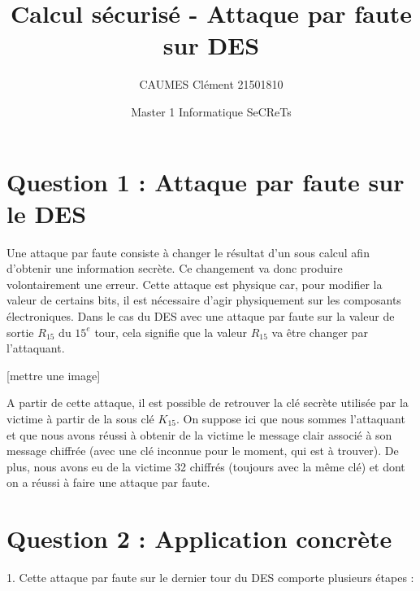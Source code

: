 \documentclass[11pt]{article}
\title{\huge{\textbf Calcul sécurisé - Attaque par faute sur DES}}
\author{CAUMES Clément 21501810}
\date{Master 1 Informatique SeCReTs}
\begin{document}
\maketitle
\vspace{20em}
\newpage

\tableofcontents
\newpage

\section{Question 1 : Attaque par faute sur le DES}

Une attaque par faute consiste à changer le résultat d'un sous calcul afin d'obtenir une information secrète. Ce changement va donc produire volontairement une erreur. Cette attaque est physique car, pour modifier la valeur de certains bits, il est nécessaire d'agir physiquement sur les composants électroniques. 
Dans le cas du DES avec une attaque par faute sur la valeur de sortie $R_{15}$ du $15^{e}$ tour, cela signifie que la valeur $R_{15}$ va être changer par l'attaquant. 

[mettre une image]

A partir de cette attaque, il est possible de retrouver la clé secrète utilisée par la victime à partir de la sous clé $K_{15}$. On suppose ici que nous sommes l'attaquant et que nous avons réussi à obtenir de la victime le message clair associé à son message chiffrée (avec une clé inconnue pour le moment, qui est à trouver). De plus, nous avons eu de la victime 32 chiffrés (toujours avec la même clé) et dont on a réussi à faire une attaque par faute. 

\section{Question 2 : Application concrète}

1. Cette attaque par faute sur le dernier tour du DES comporte plusieurs étapes : 
\end{document}
